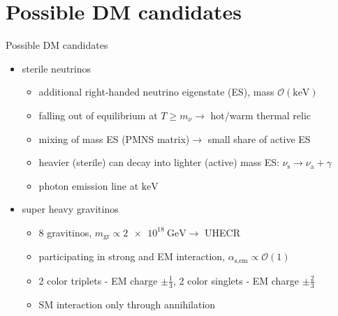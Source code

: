 \documentclass[11pt,a4paper,titlepage]{beamer}
\begin{document}
\section{Possible DM candidates}
\begin{frame}{Possible DM candidates}
\begin{itemize}
\item sterile neutrinos\footnotemark[9]
\begin{itemize}
\item additional right-handed neutrino eigenstate (ES), mass $\mathcal{O}(\si{\kilo\eV})$ \medskip
\item falling out of equilibrium at $T\geq m_{\nu} \rightarrow$ hot/warm thermal relic\medskip
\item mixing of mass ES (PMNS matrix)$\rightarrow$ small share of active ES\medskip
\item heavier (sterile) can decay into lighter (active) mass ES: $\nu_\text{s} \rightarrow \nu_\text{a} + \gamma$\medskip
\item photon emission line at $\si{\kilo\eV}$
\end{itemize}\vfill
\item super heavy gravitinos\footnotemark[10]
\begin{itemize}
\item 8 gravitinos, $m_\text{gr}\propto \SI{2e18}{\giga\eV} \rightarrow$ UHECR\medskip
\item participating in strong and EM interaction, $\alpha_\text{s,em}\propto \mathcal{O}(1)$\medskip
\item 2 color triplets - EM charge $\pm \frac{1}{3}$, 2 color singlets - EM charge $\pm \frac{2}{3}$\medskip
\item SM interaction only through annihilation
\end{itemize}
\end{itemize}
\end{frame}
\end{document}
